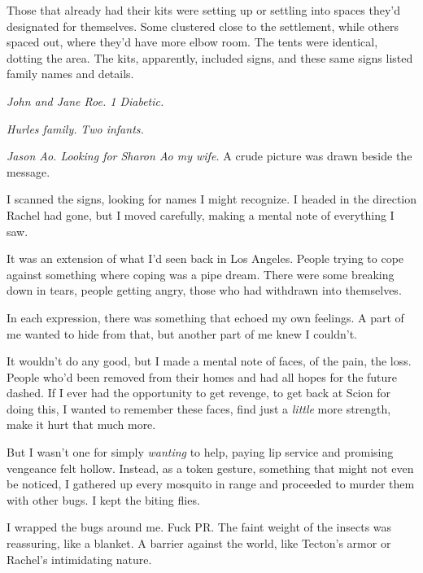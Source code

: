 Those that already had their kits were setting up or settling into spaces they'd designated for themselves.  Some clustered close to the settlement, while others spaced out, where they'd have more elbow room.  The tents were identical, dotting the area.  The kits, apparently, included signs, and these same signs listed family names and details.



\emph{John and Jane Roe.  1 Diabetic.}



\emph{Hurles family.  }\emph{Two infants.}



\emph{Jason Ao.  Looking for Sharon Ao my wife.  }A crude picture was drawn beside the message.



I scanned the signs, looking for names I might recognize.  I headed in the direction Rachel had gone, but I moved carefully, making a mental note of everything I saw.



It was an extension of what I'd seen back in Los Angeles.  People trying to cope against something where coping was a pipe dream.  There were some breaking down in tears, people getting angry, those who had withdrawn into themselves.



In each expression, there was something that echoed my own feelings.  A part of me wanted to hide from that, but another part of me knew I couldn't.



It wouldn't do any good, but I made a mental note of faces, of the pain, the loss.  People who'd been removed from their homes and had all hopes for the future dashed.  If I ever had the opportunity to get revenge, to get back at Scion for doing this, I wanted to remember these faces, find just a \emph{little} more strength, make it hurt that much more.



But I wasn't one for simply \emph{wanting} to help, paying lip service and promising vengeance felt hollow.  Instead, as a token gesture, something that might not even be noticed, I gathered up every mosquito in range and proceeded to murder them with other bugs.  I kept the biting flies.



I wrapped the bugs around me.  Fuck PR.  The faint weight of the insects was reassuring, like a blanket.  A barrier against the world, like Tecton's armor or Rachel's intimidating nature.



